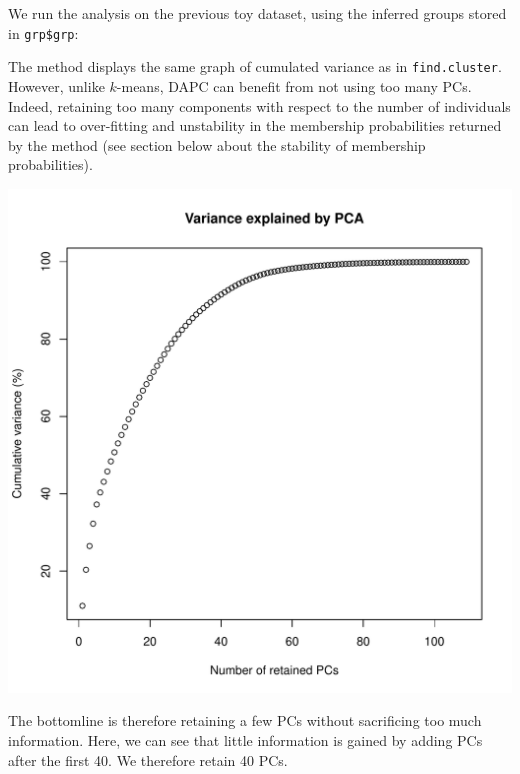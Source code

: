\documentclass{article}
\begin{document}
We run the analysis on the previous toy dataset, using the inferred groups stored in \texttt{grp\$grp}:

\begin{Schunk}
\end{Schunk}

The method displays the same graph of cumulated variance as in \texttt{find.cluster}. However, unlike
$k$-means, DAPC can benefit from not using too many PCs. Indeed, retaining too many components with
respect to the number of individuals can lead to over-fitting and unstability in the membership
probabilities returned by the method (see section below about the stability of membership probabilities).

\begin{center}
  \includegraphics[width=.7\textwidth]{figs/findclust-pca.pdf}
\end{center}

\noindent The bottomline is therefore retaining a few PCs without sacrificing too much information.
Here, we can see that little information is gained by adding PCs after the first 40. We therefore
retain 40 PCs.
\end{document}
